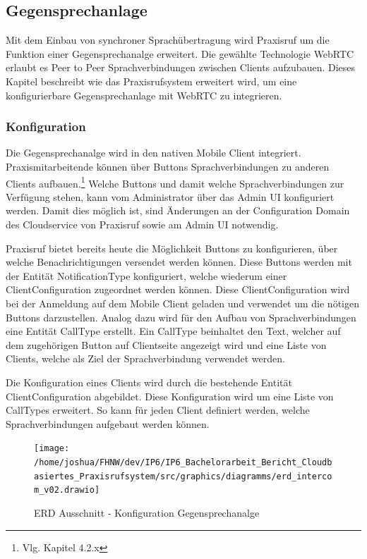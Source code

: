 \subsection{Gegensprechanlage}

Mit dem Einbau von synchroner Sprachübertragung wird Praxisruf um die Funktion einer Gegensprechanalge erweitert.
Die gewählte Technologie WebRTC erlaubt es Peer to Peer Sprachverbindungen zwischen Clients aufzubauen.
Dieses Kapitel beschreibt wie das Praxisrufsystem erweitert wird, um eine konfigurierbare Gegensprechanlage mit WebRTC zu integrieren.

\subsubsection{Konfiguration}

Die Gegensprechanalge wird in den nativen Mobile Client integriert.
Praxismitarbeitende können über Buttons Sprachverbindungen zu anderen Clients aufbauen.\footnote{Vlg. Kapitel 4.2.x}
Welche Buttons und damit welche Sprachverbindungen zur Verfügung stehen, kann vom Administrator über das Admin UI konfiguriert werden.
Damit dies möglich ist, sind Änderungen an der Configuration Domain des Cloudservice von Praxisruf sowie am Admin UI notwendig.

Praxisruf bietet bereits heute die Möglichkeit Buttons zu konfigurieren, über welche Benachrichtigungen versendet werden können.
Diese Buttons werden mit der Entität NotificationType konfiguriert, welche wiederum einer ClientConfiguration zugeordnet werden können.
Diese ClientConfiguration wird bei der Anmeldung auf dem Mobile Client geladen und verwendet um die nötigen Buttons darzustellen.
Analog dazu wird für den Aufbau von Sprachverbindungen eine Entität CallType erstellt.
Ein CallType beinhaltet den Text, welcher auf dem zugehörigen Button auf Clientseite angezeigt wird und eine Liste von Clients, welche als Ziel der Sprachverbindung verwendet werden.

Die Konfiguration eines Clients wird durch die bestehende Entität ClientConfiguration abgebildet.
Diese Konfiguration wird um eine Liste von CallTypes erweitert.
So kann für jeden Client definiert werden, welche Sprachverbindungen aufgebaut werden können.

\begin{figure}[h]
    \centering
    \begin{minipage}[b]{0.7\textwidth}
        \texttt{[image: /home/joshua/FHNW/dev/IP6/IP6\_Bachelorarbeit\_Bericht\_Cloudbasiertes\_Praxisrufsystem/src/graphics/diagramms/erd\_intercom\_v02.drawio]}
        \caption{ERD Ausschnitt - Konfiguration Gegensprechanalge}
    \end{minipage}
\end{figure}

